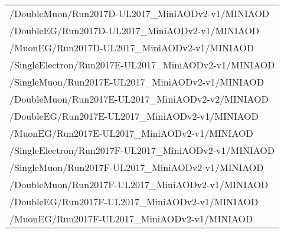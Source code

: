 \begin{table}[h]
\begin{tabular}{l}
        /DoubleMuon/Run2017D-UL2017\_MiniAODv2-v1/MINIAOD    \\
        /DoubleEG/Run2017D-UL2017\_MiniAODv2-v1/MINIAOD  \\
        /MuonEG/Run2017D-UL2017\_MiniAODv2-v1/MINIAOD    \\
        \hline
        /SingleElectron/Run2017E-UL2017\_MiniAODv2-v1/MINIAOD    \\ %
        /SingleMuon/Run2017E-UL2017\_MiniAODv2-v1/MINIAOD    \\
        /DoubleMuon/Run2017E-UL2017\_MiniAODv2-v2/MINIAOD    \\
        /DoubleEG/Run2017E-UL2017\_MiniAODv2-v1/MINIAOD  \\
        /MuonEG/Run2017E-UL2017\_MiniAODv2-v1/MINIAOD    \\
        \hline
        /SingleElectron/Run2017F-UL2017\_MiniAODv2-v1/MINIAOD    \\ %
        /SingleMuon/Run2017F-UL2017\_MiniAODv2-v1/MINIAOD    \\
        /DoubleMuon/Run2017F-UL2017\_MiniAODv2-v1/MINIAOD    \\
        /DoubleEG/Run2017F-UL2017\_MiniAODv2-v1/MINIAOD  \\
        /MuonEG/Run2017F-UL2017\_MiniAODv2-v1/MINIAOD    \\
        \hline	
		\end{tabular}
	\label{table:2017_dataSamples_dilep}
\end{table}
